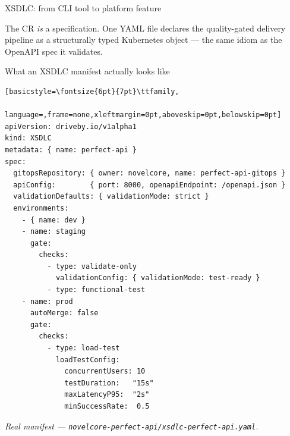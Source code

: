 \documentclass[10pt,aspectratio=169]{beamer}
\begin{document}
\begin{frame}{XSDLC: from CLI tool to platform feature}
\begin{center}
\end{center}

\vspace{0.1em}
\footnotesize
\alert{The CR \emph{is} a specification.} One YAML file declares the
quality-gated delivery pipeline as a structurally typed Kubernetes
object --- the same idiom as the OpenAPI spec it validates.

\end{frame}

\begin{frame}[fragile]{What an XSDLC manifest actually looks like}

\vspace{-1.2em}
\begin{lstlisting}[basicstyle=\fontsize{6pt}{7pt}\ttfamily,
                   language=,frame=none,xleftmargin=0pt,aboveskip=0pt,belowskip=0pt]
apiVersion: driveby.io/v1alpha1
kind: XSDLC
metadata: { name: perfect-api }
spec:
  gitopsRepository: { owner: novelcore, name: perfect-api-gitops }
  apiConfig:        { port: 8000, openapiEndpoint: /openapi.json }
  validationDefaults: { validationMode: strict }
  environments:
    - { name: dev }
    - name: staging
      gate:
        checks:
          - type: validate-only
            validationConfig: { validationMode: test-ready }
          - type: functional-test
    - name: prod
      autoMerge: false
      gate:
        checks:
          - type: load-test
            loadTestConfig:
              concurrentUsers: 10
              testDuration:   "15s"
              maxLatencyP95:  "2s"
              minSuccessRate:  0.5
\end{lstlisting}

\tiny\itshape Real manifest --- \texttt{novelcore-perfect-api/xsdlc-perfect-api.yaml}.

\end{frame}
\end{document}
